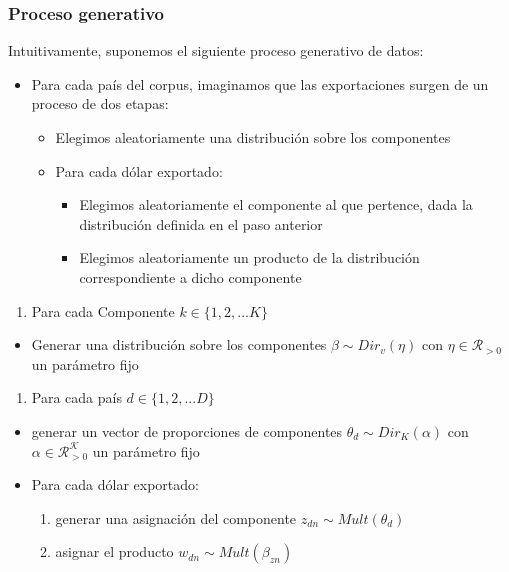 \documentclass[class=article, crop=false]{standalone}
\begin{document}
\subsubsection{Proceso generativo}

Intuitivamente, suponemos el siguiente proceso generativo de datos:

\begin{itemize}
\item
Para cada país del corpus, imaginamos que las exportaciones surgen de
un proceso de dos etapas:

\begin{itemize}
	\item
	Elegimos aleatoriamente una distribución sobre los componentes
	\item
	Para cada dólar exportado:
	
	\begin{itemize}
		\item
		Elegimos aleatoriamente el componente al que pertence, dada la
		distribución definida en el paso anterior
		\item
		Elegimos aleatoriamente un producto de la distribución
		correspondiente a dicho componente
	\end{itemize}
\end{itemize}
\end{itemize}

\begin{enumerate}
\def\labelenumi{\arabic{enumi}.}
\item
Para cada Componente \(k \in \{1,2,... K\}\)
\end{enumerate}

\begin{itemize}
\item
Generar una distribución sobre los componentes
\(\beta \sim Dir_v(\eta)\) con \(\eta \in \mathcal{R_{>0}}\) un
parámetro fijo
\end{itemize}

\begin{enumerate}
\def\labelenumi{\arabic{enumi}.}
\setcounter{enumi}{1}
\item
Para cada país \(d \in \{1,2,... D\}\)
\end{enumerate}

\begin{itemize}
\item
generar un vector de proporciones de componentes
\(\theta_d \sim Dir_K(\alpha)\) con \(\alpha \in \mathcal{R_{>0}^K}\)
un parámetro fijo
\item
Para cada dólar exportado:

\begin{enumerate}
	\def\labelenumi{\roman{enumi}.}
	\item
	generar una asignación del componente \(z_{dn} \sim Mult(\theta_d)\)
	\item
	asignar el producto \(w_{dn} \sim Mult(\beta_{zn})\)
\end{enumerate}
\end{itemize}
\end{document}
